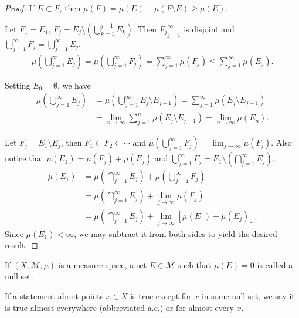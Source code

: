 \begin{proof}
    If $E \subset F$, then $\mu(F) = \mu(E) + \mu(F \setminus E) \ge \mu(E)$.

    Let $F_1 = E_1$, $F_j = E_j \setminus (\bigcup_{k=1}^{j-1} E_k)$.
    Then ${F_j}_{j=1}^{\infty}$ is disjoint and $\bigcup_{j=1}^{\infty} F_j = \bigcup_{j=1}^{\infty} E_j$.
    \begin{align}
        \mu( \bigcup_{j=1}^{\infty} E_j) = \mu( \bigcup_{j=1}^{\infty} F_j ) = \sum_{j=1}^{\infty} \mu(F_j) \le \sum_{j=1}^{\infty} \mu(E_j).
    \end{align}

    Setting $E_0 = \emptyset$, we have
    \begin{align}
        \mu( \bigcup_{j=1}^{\infty} E_j) & = \mu( \bigcup_{j=1}^{\infty} E_j \setminus E_{j-1}) = \sum_{j=1}^{\infty} \mu(E_j \setminus E_{j-1}) \\
                                         & = \lim_{n \to \infty} \sum_{j=1}^{n} \mu(E_j \setminus E_{j-1}) = \lim_{n \to \infty} \mu(E_n).
    \end{align}

    Let $F_j = E_1 \setminus E_j$, then $F_1 \subset F_2 \subset \cdots$ and $\mu(\bigcup_{j=1}^{\infty} F_j) = \lim_{j\to \infty} \mu(F_j)$.
    Also notice that $\mu(E_1) = \mu(F_j) + \mu(E_j)$ and $\bigcup_{j=1}^{\infty} F_j = E_1 \setminus \left( \bigcap_{j=1}^{\infty} E_j \right)$.
    \begin{align}
        \mu(E_1) & = \mu( \bigcap_{j=1}^{\infty} E_j ) + \mu(\bigcup_{j=1}^{\infty} F_j)           \\
                 & = \mu( \bigcap_{j=1}^{\infty} E_j ) + \lim_{j\to \infty} \mu(F_j)               \\
                 & = \mu( \bigcap_{j=1}^{\infty} E_j ) + \lim_{j\to \infty} [\mu(E_1) - \mu(E_j)].
    \end{align}
    Since $\mu(E_1) < \infty$, we may subtract it from both sides to yield the desired result.
\end{proof}

\begin{definition}
    If $(X, \mathcal{M}, \mu)$ is a measure space, a set $E \in \mathcal{M}$ such that $\mu(E) = 0$ is called a null set.
\end{definition}

\begin{definition}
    If a statement about points $x \in X$ is true except for $x$ in some null set, we say it is true almost everywhere (abbreviated a.e.) or for almost every $x$.
\end{definition}

